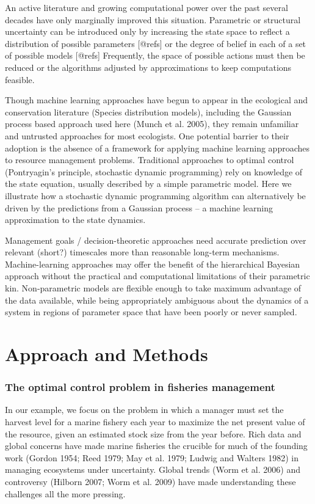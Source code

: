 \documentclass[author-year, review]{elsarticle} %
\begin{document}
An active literature and growing computational power over the past
several decades have only marginally improved this situation. Parametric
or structural uncertainty can be introduced only by increasing the state
space to reflect a distribution of possible parameters {[}@refs{]} or
the degree of belief in each of a set of possible models {[}@refs{]}
Frequently, the space of possible actions must then be reduced or the
algorithms adjusted by approximations to keep computations feasible.

Though machine learning approaches have begun to appear in the
ecological and conservation literature (Species distribution models),
including the Gaussian process based approach used here (Munch et al.
2005), they remain unfamiliar and untrusted approaches for most
ecologists. One potential barrier to their adoption is the absence of a
framework for applying machine learning approaches to resource
management problems. Traditional approaches to optimal control
(Pontryagin's principle, stochastic dynamic programming) rely on
knowledge of the state equation, usually described by a simple
parametric model. Here we illustrate how a stochastic dynamic
programming algorithm can alternatively be driven by the predictions
from a Gaussian process -- a machine learning approximation to the state
dynamics.

Management goals / decision-theoretic approaches need accurate
prediction over relevant (short?) timescales more than reasonable
long-term mechanisms. Machine-learning approaches may offer the benefit
of the hierarchical Bayesian approach without the practical and
computational limitations of their parametric kin. Non-parametric models
are flexible enough to take maximum advantage of the data available,
while being appropriately ambiguous about the dynamics of a system in
regions of parameter space that have been poorly or never sampled.

\section{Approach and Methods}

\subsubsection{The optimal control problem in fisheries management}

In our example, we focus on the problem in which a manager must set the
harvest level for a marine fishery each year to maximize the net present
value of the resource, given an estimated stock size from the year
before. Rich data and global concerns have made marine fisheries the
crucible for much of the founding work (Gordon 1954; Reed 1979; May et
al. 1979; Ludwig and Walters 1982) in managing ecosystems under
uncertainty. Global trends (Worm et al. 2006) and controversy (Hilborn
2007; Worm et al. 2009) have made understanding these challenges all the
more pressing.
\end{document}
